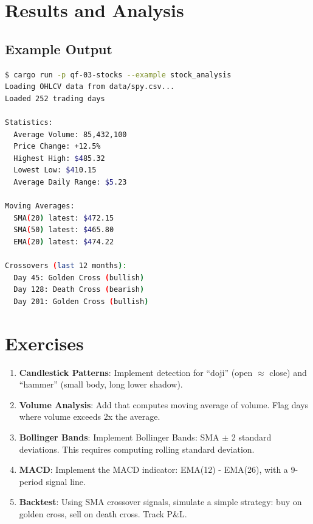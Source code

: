 \section{Results and Analysis}

\subsection{Example Output}

\begin{lstlisting}[language=bash]
$ cargo run -p qf-03-stocks --example stock_analysis
Loading OHLCV data from data/spy.csv...
Loaded 252 trading days

Statistics:
  Average Volume: 85,432,100
  Price Change: +12.5%
  Highest High: $485.32
  Lowest Low: $410.15
  Average Daily Range: $5.23

Moving Averages:
  SMA(20) latest: $472.15
  SMA(50) latest: $465.80
  EMA(20) latest: $474.22

Crossovers (last 12 months):
  Day 45: Golden Cross (bullish)
  Day 128: Death Cross (bearish)
  Day 201: Golden Cross (bullish)
\end{lstlisting}

\section{Exercises}

\begin{enumerate}
    \item \textbf{Candlestick Patterns}: Implement detection for ``doji''
      (open $\approx$ close) and ``hammer'' (small body, long lower shadow).

    \item \textbf{Volume Analysis}: Add  that computes moving
      average of volume. Flag days where volume exceeds 2x the average.

    \item \textbf{Bollinger Bands}: Implement Bollinger Bands: SMA $\pm$ 2
      standard deviations. This requires computing rolling standard deviation.

    \item \textbf{MACD}: Implement the MACD indicator: EMA(12) - EMA(26), with
      a 9-period signal line.

    \item \textbf{Backtest}: Using SMA crossover signals, simulate a simple
      strategy: buy on golden cross, sell on death cross. Track P\&L.
\end{enumerate}

